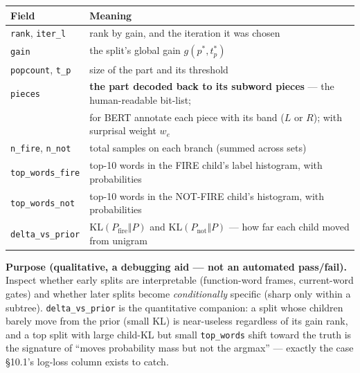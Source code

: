 \documentclass[11pt]{article}
\newcommand{\code}[1]{\texttt{#1}}
\begin{document}
\begin{center}
\begin{longtable}{@{}ll@{}}
\toprule
Field & Meaning\\
\midrule
\endhead
\code{rank}, \code{iter\_l} & rank by gain, and the iteration it was chosen\\
\code{gain} & the split's global gain $g(p^*,t_p^*)$\\
\code{popcount}, \code{t\_p} & size of the part and its threshold\\
\code{pieces} & \textbf{the part decoded back to its subword pieces} --- the human-readable bit-list;\\
 & for BERT annotate each piece with its band ($L$ or $R$); with surprisal weight $w_e$\\
\code{n\_fire}, \code{n\_not} & total samples on each branch (summed across sets)\\
\code{top\_words\_fire} & top-10 words in the FIRE child's label histogram, with probabilities\\
\code{top\_words\_not} & top-10 words in the NOT-FIRE child's histogram, with probabilities\\
\code{delta\_vs\_prior} & KL$(P_{\text{fire}}\Vert P)$ and KL$(P_{\text{not}}\Vert P)$ --- how far each child moved from unigram\\
\bottomrule
\end{longtable}
\end{center}

\noindent\textbf{Purpose (qualitative, a debugging aid --- not an automated pass/fail).} Inspect whether early splits are interpretable (function-word frames, current-word gates) and whether later splits become \emph{conditionally} specific (sharp only within a subtree). \code{delta\_vs\_prior} is the quantitative companion: a split whose children barely move from the prior (small KL) is near-useless regardless of its gain rank, and a top split with large child-KL but small \code{top\_words} shift toward the truth is the signature of ``moves probability mass but not the argmax'' --- exactly the case \S10.1's log-loss column exists to catch.
\end{document}
